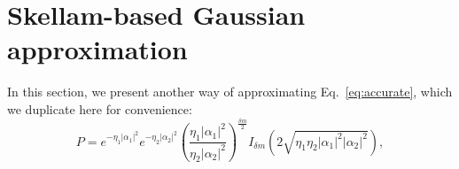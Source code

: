 \section{Skellam-based Gaussian approximation}%
\label{app:bessel}
In this section, we present another way of approximating Eq.~\eqref{eq:accurate}, which we duplicate here for convenience:
\begin{equation}
  P=e^{-\eta_1|\alpha_1|^2}e^{-\eta_2|\alpha_2|^2}
\left(\frac{\eta_1|\alpha_1|^2}{\eta_2|\alpha_2|^2}\right)^{\frac{\delta m}{2}}
I_{\delta m}\left(2\sqrt{\eta_1\eta_2|\alpha_1|^2|\alpha_2|^2}\right),\label{eq:Skellam}
\end{equation}


